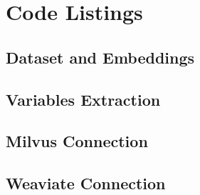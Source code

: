 \chapter{Code Listings}

\section{Dataset and Embeddings}
\label{app:dataset-and-embeddings}


\section{Variables Extraction}
\label{app:variables-extraction}


\newpage

\section{Milvus Connection}
\label{app:milvus-connection}


\section{Weaviate Connection}
\label{app:weaviate-connection}
